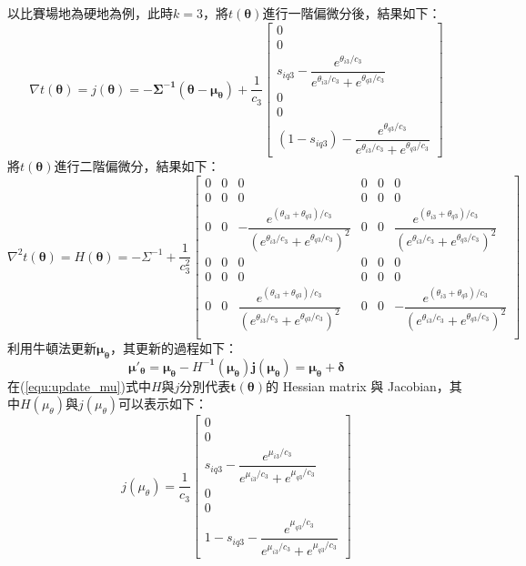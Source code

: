 \documentclass[12pt]{article}
\begin{document}
以比賽場地為硬地為例，此時$k=3$，將$t(\boldsymbol{\theta})$進行一階偏微分後，結果如下：
\begin{equation}
\nabla t(\boldsymbol{\theta})= j(\boldsymbol{\theta}) = - \boldsymbol{\Sigma^{-1}(\theta-\mu_{\theta})} + \dfrac{1}{c_3}\begin{bmatrix}
0\\0\\s_{iq3}-\dfrac{e^{\theta_{i3}/c_3}}{e^{\theta_{i3}/c_3}+e^{\theta_{q3}/c_3}}\\0\\0\\(1-s_{iq3})-\dfrac{e^{\theta_{q3}/c_3}}{e^{\theta_{i3}/c_3}+e^{\theta_{q3}/c_3}}
\end{bmatrix}
\end{equation}
將$t(\boldsymbol{\theta})$進行二階偏微分，結果如下：
\begin{equation}
\nabla^2 t(\boldsymbol{\theta}) = \textit{H}(\boldsymbol{\theta})= - \Sigma^{-1} + \dfrac{1}{c^2_3}\begin{bmatrix}
0&0&0&0&0&0\\
0&0&0&0&0&0\\
0&0&-\dfrac{e^{(\theta_{i3}+\theta_{q3})/c_3}}{(e^{\theta_{i3}/c_3}+e^{\theta_{q3}/c_3})^2}&0&0&\dfrac{e^{(\theta_{i3}+\theta_{q3})/c_3}}{(e^{\theta_{i3}/c_3}+e^{\theta_{q3}/c_3})^2}\\
0&0&0&0&0&0\\
0&0&0&0&0&0\\
0&0&\dfrac{e^{(\theta_{i3}+\theta_{q3})/c_3}}{(e^{\theta_{i3}/c_3}+e^{\theta_{q3}/c_3})^2}&0&0&-\dfrac{e^{(\theta_{i3}+\theta_{q3})/c_3}}{(e^{\theta_{i3}/c_3}+e^{\theta_{q3}/c_3})^2}\\
\end{bmatrix}
\end{equation}
利用牛頓法更新$\boldsymbol{\mu_{\theta}}$，其更新的過程如下：
\begin{equation}
\boldsymbol{\mu'_{\theta} = \mu_{\theta} - \textit{H}^{-1}(\mu_{\theta})j(\mu_{\theta}) = \mu_{\theta} + \delta} 
\label{equ:update_mu}
\end{equation}
在(\ref{equ:update_mu})式中$\textit{H}$與$j$分別代表$\boldsymbol{t(\theta)}$的 Hessian matrix 與 Jacobian，其中$\textit{H}(\mu_{\theta})$與$j(\mu_{\theta})$可以表示如下：
\begin{equation}
j(\mu_{\theta}) =\dfrac{1}{c_3} \begin{bmatrix}
0\\0\\s_{iq3} - \dfrac{e^{\mu_{i3}/c_3}}{e^{\mu_{i3}/c_3}+e^{\mu_{q3}/c_3}}\\0\\0\\1-s_{iq3}-\dfrac{e^{\mu_{q3}/c_3}}{e^{\mu_{i3}/c_3}+e^{\mu_{q3}/c_3}}
\end{bmatrix}
\end{equation}
\end{document}
